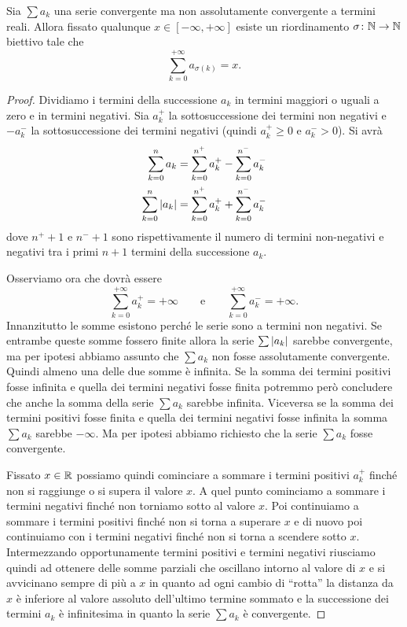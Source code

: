 \begin{theorem}%
\label{th:convergenza_condizionata}%
%
%
Sia $\sum a_k$ una serie convergente ma non assolutamente convergente a termini reali.
Allora fissato qualunque $x \in [-\infty , +\infty]$ esiste un riordinamento
$\sigma \colon {\mathbb N} \to {\mathbb N}$ biettivo tale che
\[
  \sum_{k=0}^{+\infty}  a_{\sigma(k)} = x.
\]
\end{theorem}
%
\begin{proof}
Dividiamo i termini della successione $a_k$ in termini maggiori o uguali a zero
e in termini negativi. Sia $a^+_k$ la sottosuccessione dei termini non negativi
e $-a^-_k$ la sottosuccessione
dei termini negativi (quindi $a^+_k\ge 0$ e $a^-_k > 0$). Si avrà
\begin{align*}
  \sum_{k=0}^n a_k &= \sum_{k=0}^{n^+} a^+_k - \sum_{k=0}^{n^-} a^-_k \\
  \sum_{k=0}^n {\left|a_k\right|} &= \sum_{k=0}^{n^+} a^+_k + \sum_{k=0}^{n^-} a^-_k
\end{align*}
dove $n^+ +1$ e $n^-+1$ sono rispettivamente
il numero di termini non-negativi e negativi
tra i primi $n+1$ termini della successione $a_k$.

Osserviamo ora che dovrà essere
\[
\sum_{k=0}^{+\infty} a_k^+ = +\infty \qquad \text{e} \qquad
\sum_{k=0}^{+\infty} a_k^- = +\infty.
\]
Innanzitutto le somme esistono perché le serie sono a termini non negativi.
Se entrambe queste somme fossero finite allora la serie $\sum{\left|a_k\right|}$ sarebbe convergente, ma per ipotesi abbiamo assunto che $\sum a_k$ non fosse
assolutamente convergente.
Quindi almeno una delle due somme è infinita. Se la somma dei termini positivi
fosse infinita e quella dei termini negativi fosse finita potremmo però
concludere che anche la somma della serie $\sum a_k$ sarebbe infinita.
Viceversa se la somma dei termini positivi fosse finita e quella dei termini
negativi fosse infinita la somma $\sum a_k$ sarebbe $-\infty$. Ma per ipotesi
abbiamo richiesto che la serie $\sum a_k$ fosse convergente.

Fissato $x\in {\mathbb R}$ possiamo quindi cominciare a sommare i termini positivi
$a^+_k$ finché non si raggiunge o si supera il valore $x$. A quel punto cominciamo a sommare i termini negativi finché non torniamo sotto al valore $x$.
Poi continuiamo a sommare i termini positivi finché non si torna a superare $x$
e di nuovo poi continuiamo con i termini negativi finché non si torna a scendere
sotto $x$. Intermezzando opportunamente termini positivi e termini negativi
riusciamo quindi ad ottenere delle somme parziali che oscillano intorno al valore 
di $x$ e si avvicinano sempre di più a $x$ in quanto ad ogni cambio di ``rotta'' 
la distanza da $x$ è inferiore al valore assoluto dell'ultimo termine sommato 
e la successione dei termini $a_k$ è infinitesima in quanto la serie $\sum a_k$ è convergente.


\end{proof}
